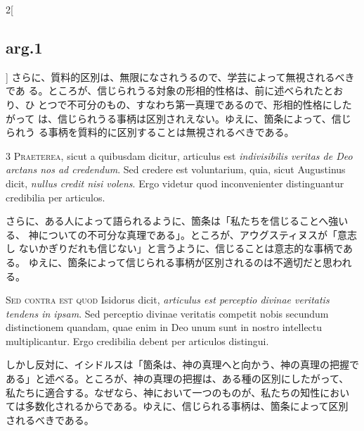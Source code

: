 \documentclass[paper=a4paper,fontsize=10pt,jafontsize=9pt,titlepage]{jlreq}
\begin{document}
\begin{paracol}{2}[\subsection{arg.1}]
さらに、質料的区別は、無限になされうるので、学芸によって無視されるべきであ
 る。ところが、信じられうる対象の形相的性格は、前に述べられたとおり、ひ
 とつで不可分のもの、すなわち第一真理であるので、形相的性格にしたがって
 は、信じられうる事柄は区別されえない。ゆえに、箇条によって、信じられう
 る事柄を質料的に区別することは無視されるべきである。


{\scshape 3 Praeterea}, sicut a quibusdam dicitur, articulus est
{\itshape indivisibilis veritas de Deo arctans nos ad credendum}. Sed
credere est voluntarium, quia, sicut Augustinus dicit, {\itshape nullus
credit nisi volens}. Ergo videtur quod inconvenienter distinguantur
credibilia per articulos.

\switchcolumn

さらに、ある人によって語られるように、箇条は「私たちを信じることへ強いる、
 神についての不可分な真理である」。ところが、アウグスティヌスが「意志し
 ないかぎりだれも信じない」と言うように、信じることは意志的な事柄である。
 ゆえに、箇条によって信じられる事柄が区別されるのは不適切だと思われる。

\switchcolumn*[\subsection{s.c.}]

{\scshape Sed contra est quod} Isidorus dicit, {\itshape articulus est
perceptio divinae veritatis tendens in ipsam}. Sed perceptio divinae
veritatis competit nobis secundum distinctionem quandam, quae enim in
Deo unum sunt in nostro intellectu multiplicantur. Ergo credibilia
debent per articulos distingui.

\switchcolumn

しかし反対に、イシドルスは「箇条は、神の真理へと向かう、神の真理の把握で
 ある」と述べる。ところが、神の真理の把握は、ある種の区別にしたがって、
 私たちに適合する。なぜなら、神において一つのものが、私たちの知性におい
 ては多数化されるからである。ゆえに、信じられる事柄は、箇条によって区別
 されるべきである。



\end{paracol}
\end{document}
